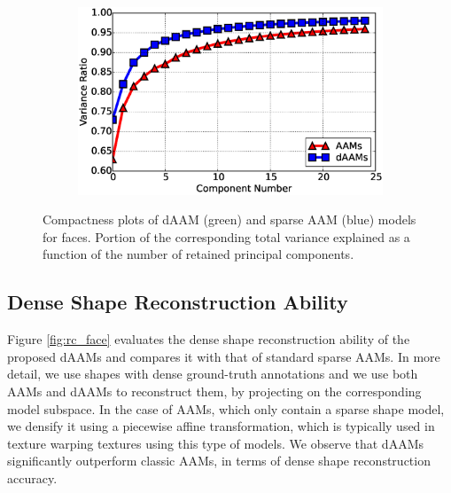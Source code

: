 \begin{figure}[!b]
    \centering
    \begin{subfigure}[b]{0.43\textwidth}
            \includegraphics[width=\textwidth]{Suplementory_Meterial/Model_Analysis/cumu_var_ratio}
    \end{subfigure}
    \caption{Compactness plots of dAAM (green) and sparse AAM (blue) models for faces. Portion of the corresponding total variance explained as a function of the number of retained principal components.}
    \label{fig:compact}
\end{figure}

\subsection{Dense Shape Reconstruction Ability}

Figure \ref{fig:rc_face} evaluates the dense shape reconstruction ability of the proposed dAAMs and compares it with that of standard sparse AAMs. In more detail, we use shapes with dense 
ground-truth annotations and we use both AAMs and dAAMs to reconstruct them, by projecting on the corresponding model subspace. In the case of AAMs, which only contain a sparse shape model, we densify it using a piecewise affine transformation, which is typically used in texture warping textures using this type of models. We observe that dAAMs significantly outperform classic AAMs, in terms of dense shape reconstruction accuracy.

